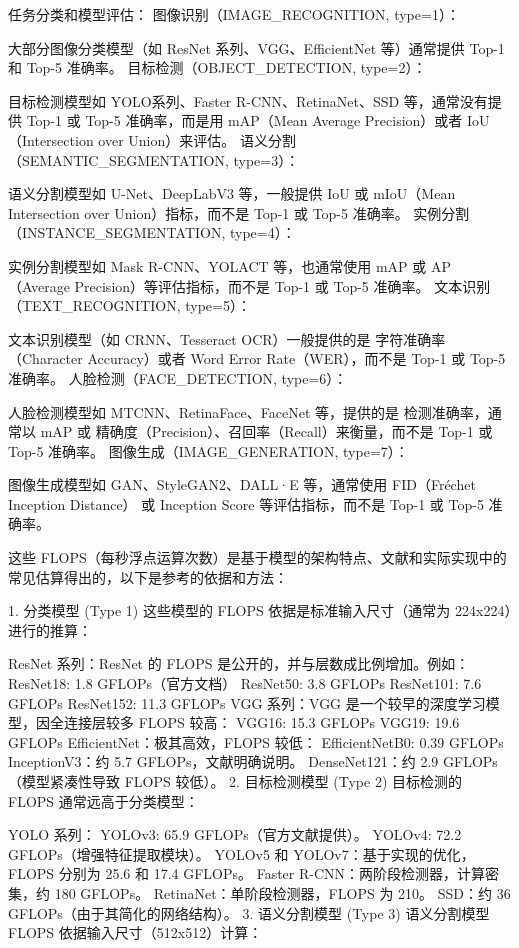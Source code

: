 任务分类和模型评估：
图像识别（IMAGE_RECOGNITION, type=1）：

大部分图像分类模型（如 ResNet 系列、VGG、EfficientNet 等）通常提供 Top-1 和 Top-5 准确率。
目标检测（OBJECT_DETECTION, type=2）：

目标检测模型如 YOLO系列、Faster R-CNN、RetinaNet、SSD 等，通常没有提供 Top-1 或 Top-5 准确率，而是用 mAP（Mean Average Precision）或者 IoU（Intersection over Union）来评估。
语义分割（SEMANTIC_SEGMENTATION, type=3）：

语义分割模型如 U-Net、DeepLabV3 等，一般提供 IoU 或 mIoU（Mean Intersection over Union）指标，而不是 Top-1 或 Top-5 准确率。
实例分割（INSTANCE_SEGMENTATION, type=4）：

实例分割模型如 Mask R-CNN、YOLACT 等，也通常使用 mAP 或 AP（Average Precision）等评估指标，而不是 Top-1 或 Top-5 准确率。
文本识别（TEXT_RECOGNITION, type=5）：

文本识别模型（如 CRNN、Tesseract OCR）一般提供的是 字符准确率（Character Accuracy）或者 Word Error Rate（WER），而不是 Top-1 或 Top-5 准确率。
人脸检测（FACE_DETECTION, type=6）：

人脸检测模型如 MTCNN、RetinaFace、FaceNet 等，提供的是 检测准确率，通常以 mAP 或 精确度（Precision）、召回率（Recall）来衡量，而不是 Top-1 或 Top-5 准确率。
图像生成（IMAGE_GENERATION, type=7）：

图像生成模型如 GAN、StyleGAN2、DALL·E 等，通常使用 FID（Fréchet Inception Distance） 或 Inception Score 等评估指标，而不是 Top-1 或 Top-5 准确率。



这些 FLOPS（每秒浮点运算次数）是基于模型的架构特点、文献和实际实现中的常见估算得出的，以下是参考的依据和方法：

1. 分类模型 (Type 1)
这些模型的 FLOPS 依据是标准输入尺寸（通常为 224x224）进行的推算：

ResNet 系列：ResNet 的 FLOPS 是公开的，并与层数成比例增加。例如：
ResNet18: 1.8 GFLOPs（官方文档）
ResNet50: 3.8 GFLOPs
ResNet101: 7.6 GFLOPs
ResNet152: 11.3 GFLOPs
VGG 系列：VGG 是一个较早的深度学习模型，因全连接层较多 FLOPS 较高：
VGG16: 15.3 GFLOPs
VGG19: 19.6 GFLOPs
EfficientNet：极其高效，FLOPS 较低：
EfficientNetB0: 0.39 GFLOPs
InceptionV3：约 5.7 GFLOPs，文献明确说明。
DenseNet121：约 2.9 GFLOPs（模型紧凑性导致 FLOPS 较低）。
2. 目标检测模型 (Type 2)
目标检测的 FLOPS 通常远高于分类模型：

YOLO 系列：
YOLOv3: 65.9 GFLOPs（官方文献提供）。
YOLOv4: 72.2 GFLOPs（增强特征提取模块）。
YOLOv5 和 YOLOv7：基于实现的优化，FLOPS 分别为 25.6 和 17.4 GFLOPs。
Faster R-CNN：两阶段检测器，计算密集，约 180 GFLOPs。
RetinaNet：单阶段检测器，FLOPS 为 210。
SSD：约 36 GFLOPs（由于其简化的网络结构）。
3. 语义分割模型 (Type 3)
语义分割模型 FLOPS 依据输入尺寸（512x512）计算：

